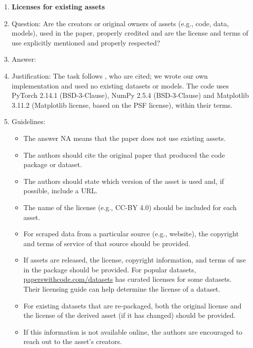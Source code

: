 \begin{enumerate}
\item {\bf Licenses for existing assets}
    \item[] Question: Are the creators or original owners of assets (e.g., code, data, models), used in the paper, properly credited and are the license and terms of use explicitly mentioned and properly respected?
    \item[] Answer: \answerYes{}
    \item[] Justification: The task follows \citet{singh2024needs}, who are cited; we wrote our own implementation and used no existing datasets or models. The code uses PyTorch 2.14.1 (BSD-3-Clause), NumPy 2.5.4 (BSD-3-Clause) and Matplotlib 3.11.2 (Matplotlib license, based on the PSF license), within their terms.
    \item[] Guidelines:
    \begin{itemize}
        \item The answer NA means that the paper does not use existing assets.
        \item The authors should cite the original paper that produced the code package or dataset.
        \item The authors should state which version of the asset is used and, if possible, include a URL.
        \item The name of the license (e.g., CC-BY 4.0) should be included for each asset.
        \item For scraped data from a particular source (e.g., website), the copyright and terms of service of that source should be provided.
        \item If assets are released, the license, copyright information, and terms of use in the package should be provided. For popular datasets, \url{paperswithcode.com/datasets} has curated licenses for some datasets. Their licensing guide can help determine the license of a dataset.
        \item For existing datasets that are re-packaged, both the original license and the license of the derived asset (if it has changed) should be provided.
        \item If this information is not available online, the authors are encouraged to reach out to the asset's creators.
    \end{itemize}


\end{enumerate}

